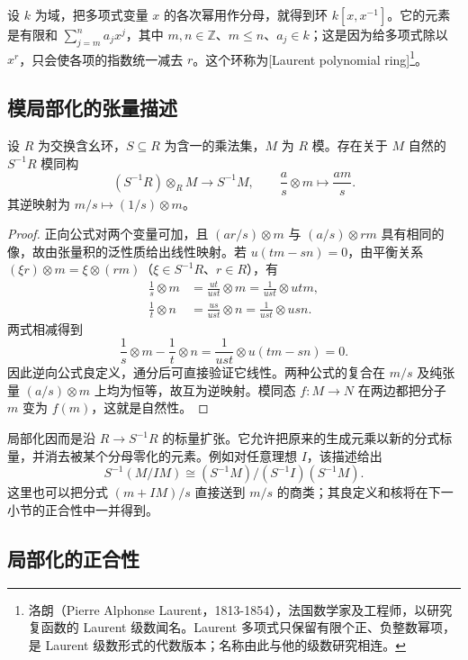 设 \(k\) 为域，把多项式变量 \(x\) 的各次幂用作分母，就得到环 \(k[x,x^{-1}]\)。它的元素是有限和 \(\sum_{j=m}^n a_jx^j\)，其中 \(m,n\in\mathbb Z\)、\(m\le n\)、\(a_j\in k\)；这是因为给多项式除以 \(x^r\)，只会使各项的指数统一减去 \(r\)。这个环称为[Laurent polynomial ring]\footnote{洛朗（Pierre Alphonse Laurent，1813-1854），法国数学家及工程师，以研究复函数的 Laurent 级数闻名。Laurent 多项式只保留有限个正、负整数幂项，是 Laurent 级数形式的代数版本；名称由此与他的级数研究相连。}。

\subsection{模局部化的张量描述}
\label{b3:subsec:0201:02}

\begin{proposition}\label{b3:prop:localization-tensor}
	设 \(R\) 为交换含幺环，\(S\subseteq R\) 为含一的乘法集，\(M\) 为 \(R\) 模。存在关于 \(M\) 自然的 \(S^{-1}R\) 模同构
	\[
		(S^{-1}R)\otimes_R M\longrightarrow S^{-1}M, \qquad \frac as\otimes m\longmapsto\frac{am}s.
	\]
	其逆映射为 \(m/s\mapsto(1/s)\otimes m\)。
\end{proposition}
\begin{proof}
	正向公式对两个变量可加，且 \((ar/s)\otimes m\) 与 \((a/s)\otimes rm\) 具有相同的像，故由张量积的泛性质给出线性映射。若 \(u(tm-sn)=0\)，由平衡关系 \((\xi r)\otimes m=\xi\otimes(rm)\)（\(\xi\in S^{-1}R\)、\(r\in R\)），有
	\[
		\begin{aligned}
			\frac1s\otimes m&=\frac{ut}{ust}\otimes m =\frac1{ust}\otimes utm,\\
			\frac1t\otimes n&=\frac{us}{ust}\otimes n =\frac1{ust}\otimes usn.
		\end{aligned}
	\]
	两式相减得到
	\[
		\frac1s\otimes m-\frac1t\otimes n =\frac1{ust}\otimes u(tm-sn)=0.
	\]
	因此逆向公式良定义，通分后可直接验证它线性。两种公式的复合在 \(m/s\) 及纯张量 \((a/s)\otimes m\) 上均为恒等，故互为逆映射。模同态 \(f:M\rightarrow N\) 在两边都把分子 \(m\) 变为 \(f(m)\)，这就是自然性。
\end{proof}

局部化因而是沿 \(R\rightarrow S^{-1}R\) 的标量扩张。它允许把原来的生成元乘以新的分式标量，并消去被某个分母零化的元素。例如对任意理想 \(I\)，该描述给出
\[
	S^{-1}(M/IM)\cong(S^{-1}M)/(S^{-1}I)(S^{-1}M).
\]
这里也可以把分式 \((m+IM)/s\) 直接送到 \(m/s\) 的商类；其良定义和核将在下一小节的正合性中一并得到。

\subsection{局部化的正合性}
\label{b3:subsec:0201:03}


